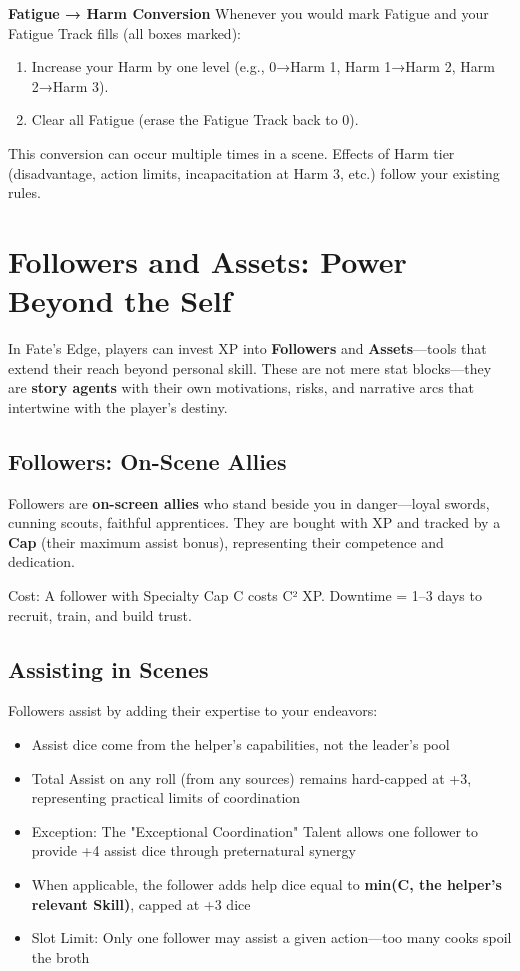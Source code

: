 \textbf{Fatigue → Harm Conversion}
Whenever you would mark Fatigue and your Fatigue Track fills (all boxes marked):
\begin{enumerate}
    \item Increase your Harm by one level (e.g., 0→Harm 1, Harm 1→Harm 2, Harm 2→Harm 3).
    \item Clear all Fatigue (erase the Fatigue Track back to 0).
\end{enumerate}

This conversion can occur multiple times in a scene. Effects of Harm tier (disadvantage, action limits, incapacitation at Harm 3, etc.) follow your existing rules.

\section*{Followers and Assets: Power Beyond the Self}

In Fate's Edge, players can invest XP into \textbf{Followers} and \textbf{Assets}---tools that extend their reach beyond personal skill. These are not mere stat blocks---they are \textbf{story agents} with their own motivations, risks, and narrative arcs that intertwine with the player's destiny.

\subsection*{Followers: On-Scene Allies}

Followers are \textbf{on-screen allies} who stand beside you in danger—loyal swords, cunning scouts, faithful apprentices. They are bought with XP and tracked by a \textbf{Cap} (their maximum assist bonus), representing their competence and dedication.

Cost: A follower with Specialty Cap C costs C² XP. Downtime = 1--3 days to recruit, train, and build trust.

\subsection*{Assisting in Scenes}

Followers assist by adding their expertise to your endeavors:

\begin{itemize}
    \item Assist dice come from the helper's capabilities, not the leader's pool
    \item Total Assist on any roll (from any sources) remains hard-capped at +3, representing practical limits of coordination
    \item Exception: The "Exceptional Coordination" Talent allows one follower to provide +4 assist dice through preternatural synergy
    \item When applicable, the follower adds help dice equal to \textbf{min(C, the helper's relevant Skill)}, capped at +3 dice
    \item Slot Limit: Only one follower may assist a given action—too many cooks spoil the broth
\end{itemize}

